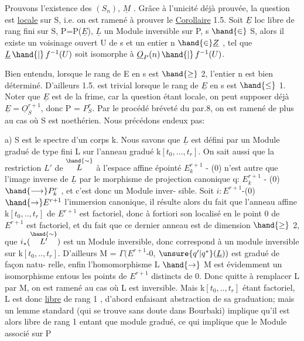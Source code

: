 
Prouvons l'existence des $(S_n)$, $\underline{M}$ . Grâce à l'unicité déjà prouvée,
la question est \uline{locale} sur S, i.e. on est ramené à prouver le
\uline{Corollaire} 1.5. Soit $\underline{E}$ loc libre de rang fini sur S, P=P($\underline{E}$), $\underline{L}$ un
Module inversible sur P, s $\hand{\in}$ S, alors il existe un voisinage ouvert U de s
et un entier n $\hand{\in} \underline{Z}$ , tel que $\underline{L}\,\hand{|}\,f^{-1}(U)$ soit isomorphe à $\underline{O}_P(n)\,\hand{|}\,f^{-1}(U)$.

\hand{\unsure{[|(}}Bien entendu, lorsque le rang de E en s est $\hand{\geq}$ 2, l'entier n est bien
déterminé. D'ailleurs 1.5. est trivial lorsque le rang de $\underline{E}$ en s est $\hand{\leq}$ 1\hand{\unsure{]|)}}.
Noter que $\underline{E}$ est de la frime, car la question étant locale, on peut supposer
déjà $\underline{E} = \underline{O}_S^{r+1}$, donc P = $P_S^{r}$\hand{\unsure{]}}. Par le procédé bréveté du par.8, on est
ramené de plus au cas où S est noethérien. Nous précédons endeux pas:

a) S est le spectre d'un corps k. Nous savons que $\underline{L}$ est défini
par un Module gradué de type fini L sur l'anneau gradué k$[t_0,\ldots,t_r]$.
On sait aussi que la restriction $L'$ de $\overset{\hand{\sim}}{L}$ à l'espace affine épointé
$E_k^{r+1}$ - (0) n'est autre que l'image inverse de $\underline{L}$ par le morphisme de
projection canonique q: $E_k^{r+1}$ - (0) $\hand{\longrightarrow} P_k^r$ , et c'est donc un Module inver-%
sible. Soit $i : E^{r+1}$-(0)$\hand{\to} E^{r+1}$ l'immersion canonique, il résulte
alors du fait que l'anneau affine k$[t_0,..,t_r]$ de $E^{r+1}$ est factoriel, donc à
fortiori son localisé en le point 0 de $E^{r+1}$ est factoriel, et du fait
que ce dernier anneau est de dimension $\hand{\geq}$ 2, que $i_*(\overset{\hand{\sim}}{L'})$ est un Module
inversible,  donc correspond à un module inversible  sur
k$[t_0,..,t_r]$. D'ailleurs M = $\Gamma(E^{r+1}$-0, $\unsure{q'|q^*}(\underline{L}))$ est gradué de façon natu-%
relle, enfin l'homomorphisme L $\hand{\to}$ M est évidemment un isomorphisme
entous les  points de $E^{r+1}$ distincts de 0. Donc quitte à
remplacer L par M, on est ramené au cas où L est inversible. Mais
k$[t_0,..,t_r]$ étant factoriel, L est donc \uline{libre} de rang 1 , d'abord
enfaisant abstraction de sa graduation; mais un lemme standard (qui se
trouve sans doute dans Bourbaki) implique qu'il est alors libre de rang 1
entant que module gradué, ce qui implique que le Module associé sur P\placedmargin{\ensuremath{\backslash}}

